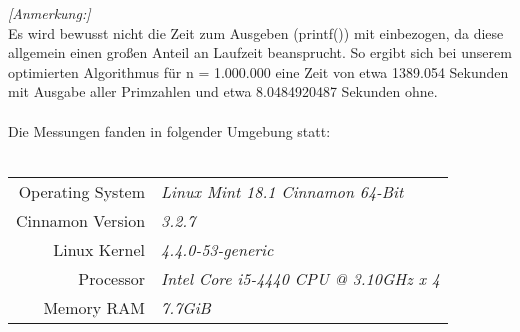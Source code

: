 \documentclass[a4paper,12pt]{article}
\begin{document}
\noindent \textit{[Anmerkung:]}\\
Es wird bewusst nicht die Zeit zum Ausgeben (printf()) mit einbezogen, da diese allgemein einen großen Anteil an Laufzeit beansprucht. So ergibt sich bei unserem optimierten Algorithmus für n = 1.000.000 eine Zeit von etwa 1389.054 Sekunden mit Ausgabe aller Primzahlen und etwa 8.0484920487 Sekunden ohne.\\\\

\noindent Die Messungen fanden in folgender Umgebung statt:\\\\
\begin{tabular}{|r|l|}
\hline
Operating System & \emph{Linux Mint 18.1 Cinnamon 64-Bit}\\
Cinnamon Version & \emph{3.2.7}\\
Linux Kernel & \emph{4.4.0-53-generic}\\
Processor & \emph{Intel Core i5-4440 CPU @ 3.10GHz x 4}\\
Memory RAM & \emph{7.7GiB}\\
\hline
\end{tabular}\\\\
\end{document}
